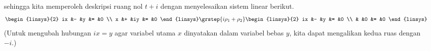 \begin{exercises}
\begin{answer}
       sehingga kita memperoleh deskripsi ruang nol $t+i$ dengan menyelesaikan
       sistem linear berikut.
       \begin{equation*}
         \begin{linsys}{2}
           ix  &-  &y  &=  &0  \\
            x  &+  &iy &=  &0
         \end{linsys}
         \grstep{i\rho_1+\rho_2}
         \begin{linsys}{2}
           ix  &-  &y  &=  &0  \\
               &   &0  &=  &0
         \end{linsys}
       \end{equation*}
       (Untuk mengubah hubungan $ix=y$ agar variabel utama $x$
       dinyatakan dalam variabel bebas $y$, kita dapat mengalikan kedua
       ruas dengan $-i$.)


\end{answer}
\end{exercises}

